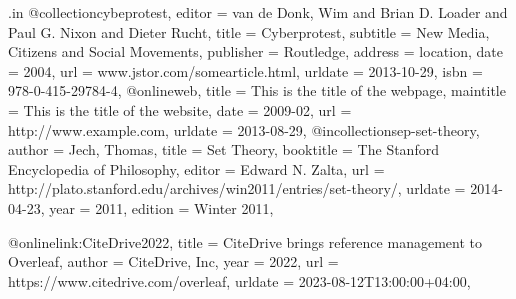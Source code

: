 \RequirePackage{filecontents}
\begin{filecontents*}[overwrite]{\jobname.in}
@collection{cybeprotest,
  editor    = {van de Donk, Wim and Brian D. Loader and Paul G. Nixon and Dieter Rucht},
  title     = {Cyberprotest},
  subtitle  = {New Media, Citizens and Social Movements},
  publisher = {Routledge},
  address   = {location},
  date      = {2004},
  url       = {www.jstor.com/somearticle.html},
  urldate   = {2013-10-29},
  isbn      = {978-0-415-29784-4},
}
@online{web,
  title     = {This is the title of the webpage},
  maintitle = {This is the title of the website},
  date      = {2009-02},
  url       = {http://www.example.com},
  urldate   = {2013-08-29},
}
@incollection{sep-set-theory,
  author       = {Jech, Thomas},
  title        = {Set Theory},
  booktitle    = {The Stanford Encyclopedia of Philosophy},
  editor       = {Edward N. Zalta},
  url          = {http://plato.stanford.edu/archives/win2011/entries/set-theory/},
  urldate      = {2014-04-23},
  year         = {2011},
  edition      = {Winter 2011},
}

@online{link:CiteDrive2022,
    title        = {CiteDrive brings reference management to Overleaf},
    author       = {CiteDrive, Inc},
    year         = 2022,
    url          = {https://www.citedrive.com/overleaf},
    urldate      = {2023-08-12T13:00:00+04:00},
}
\end{filecontents*}

\documentclass[11pt]{article}%
\usepackage{multicol}
\usepackage[margin=1.0in]{geometry}
\usepackage{hyperref}\hypersetup{linktoc=all}
\usepackage{csquotes}








